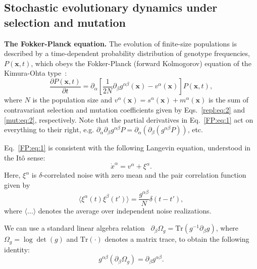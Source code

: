\documentclass[9pt,twocolumn,twoside]{gsajnl}
\begin{document}
\subsection{Stochastic evolutionary dynamics under selection and mutation}
\noindent
\textbf{The Fokker-Planck equation.}  The evolution of finite-size populations is described by a time-dependent probability distribution of genotype frequencies, $P(\mathbf{x},t)$, which obeys the Fokker-Planck
(forward Kolmogorov) equation
of the Kimura-Ohta type~\citep{Kimura1971,Kimura1983,Mustonen2010}:
\begin{equation} \label{FP:eq:1}
\frac{\partial P(\mathbf{x},t)}{\partial t} = \partial_\alpha \left[ \frac{1}{2N} \partial_\beta g^{\alpha \beta} (\mathbf{x}) - v^\alpha (\mathbf{x}) \right] P(\mathbf{x},t),
\end{equation}
where $N$ is the population size and $v^\alpha (\mathbf{x}) = s^\alpha (\mathbf{x}) + m^\alpha (\mathbf{x})$ is the sum of contravariant selection and mutation coefficients given by Eqs.~\eqref{repl:eq:2} and \eqref{mut:eq:2}, respectively.
Note that the partial derivatives in Eq.~\eqref{FP:eq:1} act on everything to their right, e.g. $\partial_\alpha \partial_\beta g^{\alpha \beta} P = \partial_\alpha (\partial_\beta (g^{\alpha \beta} P))$, etc.

Eq.~\eqref{FP:eq:1} is consistent with the following Langevin equation, understood in the It\^{o} sense: %
\begin{equation} \label{Lng:eq:1}
\dot{x}^\alpha = v^\alpha + \xi^\alpha.
\end{equation}
Here, $\xi^\alpha$ is $\delta$-correlated noise with zero mean and the pair correlation function given by
\begin{equation} \label{Lng:pair}
\langle \xi^\alpha (t) \xi^\beta (t') \rangle = \frac{g^{\alpha \beta}}{N} \delta (t-t'),
\end{equation}
where $\langle \dots \rangle$ denotes the average over independent noise realizations.

We can use a standard linear algebra relation~\citep{bishop2006pattern} $\partial_\beta \Omega_g = \text{Tr} \left( g^{-1} \partial_\beta g \right)$, where $\Omega_g = \log \det (g)$ and $\text{Tr} (\cdot)$ denotes a matrix trace,
to obtain the following identity:
\begin{equation} \label{Omega:id}
g^{\alpha \beta} (\partial_\beta \Omega_g) = \partial_\beta g^{\alpha \beta}.
\end{equation}
\end{document}
